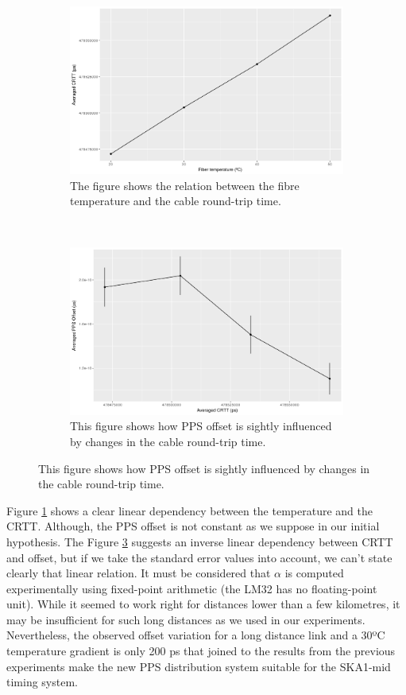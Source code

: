 \begin{figure}
	\centering
	\begin{subfigure}[t]{0.48\textwidth}
		\includegraphics[width=\textwidth]{img/crttvstemp}
		\caption[CRTT vs. Fiber temperature]{The figure shows the relation 
			between the fibre temperature and the cable round-trip time.}
		\label{fig:crttvstemp}
	\end{subfigure}
	~ %
	\begin{subfigure}[t]{0.48\textwidth}
		\includegraphics[width=\textwidth]{img/ppsvscrtt}
		\caption[PPS offset vs. CRTT]{This figure shows how PPS offset is 
			sightly influenced by changes in the cable round-trip time.}
		\label{fig:ppsvscrtt}
	\end{subfigure}
\end{figure}

Figure \ref{fig:crttvstemp} shows a clear linear dependency between the 
temperature and the CRTT. Although, the PPS offset is not constant as 
we suppose in our initial hypothesis. The Figure \ref{fig:ppsvscrtt} suggests 
an inverse linear dependency between CRTT and offset, but if we take the 
standard error values into account, we can't state clearly that linear 
relation. It must be considered that $\alpha$ is computed experimentally using 
fixed-point arithmetic (the LM32 has no floating-point unit). While it seemed 
to work right for distances lower than a few kilometres, it may be insufficient 
for such long distances as we used in our experiments. Nevertheless, the 
observed offset variation for a long distance link and a 30ºC temperature 
gradient is only 200 ps that joined to the results from the previous 
experiments make the new PPS distribution system suitable for the SKA1-mid 
timing system.
